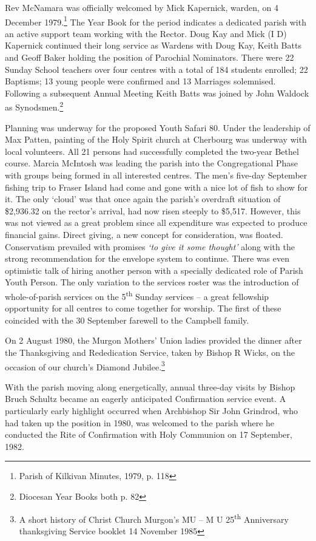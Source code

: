 Rev McNamara was officially welcomed by Mick Kapernick, warden, on 4 December 1979.\footnote{Parish of Kilkivan Minutes, 1979, p. 118} The Year Book for the period indicates a dedicated parish with an active support team working with the Rector. Doug Kay and Mick (I D) Kapernick continued their long service as Wardens with Doug Kay, Keith Batts and Geoff Baker holding the position of Parochial Nominators. There were 22 Sunday School teachers over four centres with a total of 184 students enrolled; 22 Baptisms; 13 young people were confirmed and 13 Marriages solemnised. Following a subsequent Annual Meeting Keith Batts was joined by John Waldock as Synodsmen.\footnote{Diocesan Year Books both p. 82}

Planning was underway for the proposed Youth Safari 80. Under the leadership of Max Patten, painting of the Holy Spirit church at Cherbourg was underway with local volunteers. All 21 persons had successfully completed the two-year Bethel course. Marcia McIntosh was leading the parish into the Congregational Phase with groups being formed in all interested centres. The men's five-day September fishing trip to Fraser Island had come and gone with a nice lot of fish to show for it. The only `cloud' was that once again the parish's overdraft situation of \$2,936.32 on the rector's arrival, had now risen steeply to \$5,517. However, this was not viewed as a great problem since all expenditure was expected to produce financial gains. Direct giving, a new concept for consideration, was floated. Conservatism prevailed with promises \emph{`to give it some thought'} along with the strong recommendation for the envelope system to continue. There was even optimistic talk of hiring another person with a specially dedicated role of Parish Youth Person. The only variation to the services roster was the introduction of whole-of-parish services on the 5\textsuperscript{th} Sunday services -- a great fellowship opportunity for all centres to come together for worship. The first of these coincided with the 30 September farewell to the Campbell family.

On 2 August 1980, the Murgon Mothers' Union ladies provided the dinner after the Thanksgiving and Rededication Service, taken by Bishop R Wicks, on the occasion of our church's Diamond Jubilee.\footnote{A short history of Christ Church Murgon's MU -- M U 25\textsuperscript{th} Anniversary thanksgiving Service booklet 14 November 1985}

With the parish moving along energetically, annual three-day visits by Bishop Bruch Schultz became an eagerly anticipated Confirmation service event. A particularly early highlight occurred when Archbishop Sir John Grindrod, who had taken up the position in 1980, was welcomed to the parish where he conducted the Rite of Confirmation with Holy Communion on 17 September, 1982.

